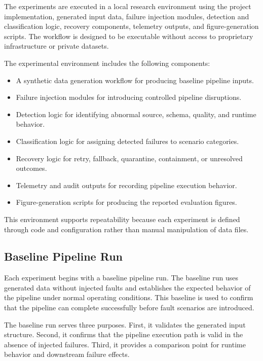 The experiments are executed in a local research environment using the project implementation, generated input data, failure injection modules, detection and classification logic, recovery components, telemetry outputs, and figure-generation scripts. The workflow is designed to be executable without access to proprietary infrastructure or private datasets.

The experimental environment includes the following components:

\begin{itemize}
    \item A synthetic data generation workflow for producing baseline pipeline inputs.
    \item Failure injection modules for introducing controlled pipeline disruptions.
    \item Detection logic for identifying abnormal source, schema, quality, and runtime behavior.
    \item Classification logic for assigning detected failures to scenario categories.
    \item Recovery logic for retry, fallback, quarantine, containment, or unresolved outcomes.
    \item Telemetry and audit outputs for recording pipeline execution behavior.
    \item Figure-generation scripts for producing the reported evaluation figures.
\end{itemize}

This environment supports repeatability because each experiment is defined through code and configuration rather than manual manipulation of data files.

\subsection{Baseline Pipeline Run}

Each experiment begins with a baseline pipeline run. The baseline run uses generated data without injected faults and establishes the expected behavior of the pipeline under normal operating conditions. This baseline is used to confirm that the pipeline can complete successfully before fault scenarios are introduced.

The baseline run serves three purposes. First, it validates the generated input structure. Second, it confirms that the pipeline execution path is valid in the absence of injected failures. Third, it provides a comparison point for runtime behavior and downstream failure effects.

